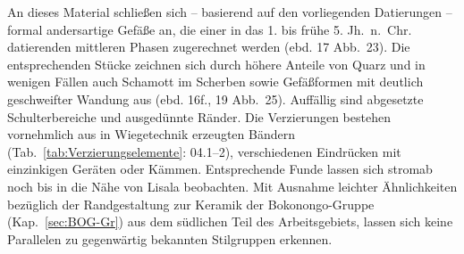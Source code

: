 An dieses Material schließen sich -- basierend auf den vorliegenden Datierungen -- formal andersartige Gefäße an, die einer in das 1. bis frühe 5. Jh.~n.~Chr. datierenden mittleren Phasen zugerechnet werden (ebd. 17 Abb.~23). Die entsprechenden Stücke zeichnen sich durch höhere Anteile von Quarz und in wenigen Fällen auch Schamott im Scherben sowie Gefäßformen mit deutlich geschweifter Wandung aus (ebd. 16f., 19 Abb.~25). Auffällig sind abgesetzte Schulterbereiche und ausgedünnte Ränder. Die Verzierungen bestehen vornehmlich aus in Wiegetechnik erzeugten Bändern (Tab.~\ref{tab:Verzierungselemente}: 04.1--2), verschiedenen Eindrücken mit einzinkigen Geräten oder Kämmen. Entsprechende Funde lassen sich stromab noch bis in die Nähe von Lisala beobachten. Mit Ausnahme leichter Ähnlichkeiten bezüglich der Randgestaltung zur Keramik der Bokonongo-Gruppe (Kap.~\ref{sec:BOG-Gr}) aus dem südlichen Teil des Arbeitsgebiets, lassen sich keine Parallelen zu gegenwärtig bekannten Stilgruppen erkennen.


